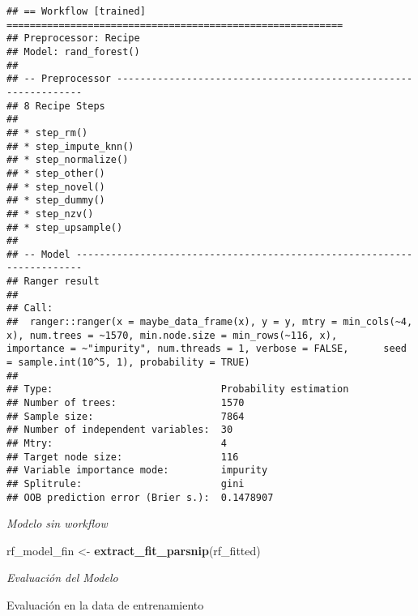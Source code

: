 \documentclass[
]{article}
\newenvironment{Shaded}{\begin{snugshade}}{\end{snugshade}}
\newcommand{\AttributeTok}[1]{\textcolor[rgb]{0.13,0.29,0.53}{#1}}
\newcommand{\FunctionTok}[1]{\textcolor[rgb]{0.13,0.29,0.53}{\textbf{#1}}}
\newcommand{\NormalTok}[1]{#1}
\newcommand{\OtherTok}[1]{\textcolor[rgb]{0.56,0.35,0.01}{#1}}
\newcommand{\SpecialCharTok}[1]{\textcolor[rgb]{0.81,0.36,0.00}{\textbf{#1}}}
\begin{document}
\begin{verbatim}
## == Workflow [trained] ==========================================================
## Preprocessor: Recipe
## Model: rand_forest()
## 
## -- Preprocessor ----------------------------------------------------------------
## 8 Recipe Steps
## 
## * step_rm()
## * step_impute_knn()
## * step_normalize()
## * step_other()
## * step_novel()
## * step_dummy()
## * step_nzv()
## * step_upsample()
## 
## -- Model -----------------------------------------------------------------------
## Ranger result
## 
## Call:
##  ranger::ranger(x = maybe_data_frame(x), y = y, mtry = min_cols(~4,      x), num.trees = ~1570, min.node.size = min_rows(~116, x),      importance = ~"impurity", num.threads = 1, verbose = FALSE,      seed = sample.int(10^5, 1), probability = TRUE) 
## 
## Type:                             Probability estimation 
## Number of trees:                  1570 
## Sample size:                      7864 
## Number of independent variables:  30 
## Mtry:                             4 
## Target node size:                 116 
## Variable importance mode:         impurity 
## Splitrule:                        gini 
## OOB prediction error (Brier s.):  0.1478907
\end{verbatim}

\emph{Modelo sin workflow}

\begin{Shaded}
\begin{Highlighting}[]
\NormalTok{rf\_model\_fin }\OtherTok{\textless{}{-}} \FunctionTok{extract\_fit\_parsnip}\NormalTok{(rf\_fitted)}
\end{Highlighting}
\end{Shaded}

\emph{Evaluación del Modelo}

Evaluación en la data de entrenamiento

\begin{Shaded}
\end{Shaded}
\end{document}
